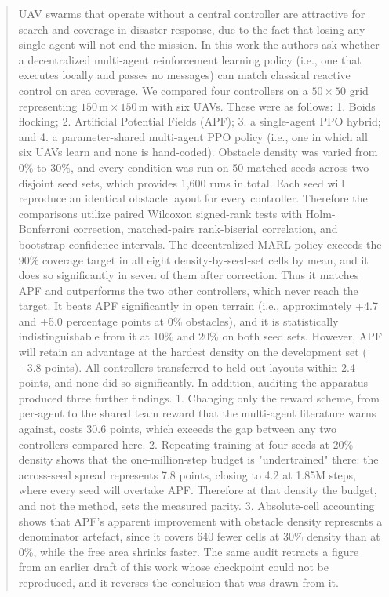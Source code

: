 \documentclass[a4paper, 10pt, conference]{ieeeconf}
\begin{document}
\begin{abstract}
UAV swarms that operate without a central controller are attractive
for search and coverage in disaster response, due to the fact that
losing any single agent will not end the mission. In this work the
authors ask whether a decentralized multi-agent reinforcement learning
policy (i.e., one that executes locally and passes no messages) can
match classical reactive control on area coverage. We compared four
controllers on a $50\times50$ grid representing
$150\,\text{m}\times150\,\text{m}$ with six UAVs. These were as
follows: 1. Boids flocking; 2. Artificial Potential Fields (APF); 3. a
single-agent PPO hybrid; and 4. a parameter-shared multi-agent PPO
policy (i.e., one in which all six UAVs learn and none is hand-coded).
Obstacle density was varied from 0\% to 30\%, and every condition was
run on 50 matched seeds across two disjoint seed sets, which provides
1{,}600 runs in total. Each seed will reproduce an identical obstacle
layout for every controller. Therefore the comparisons utilize paired
Wilcoxon signed-rank tests with Holm-Bonferroni correction,
matched-pairs rank-biserial correlation, and bootstrap confidence
intervals. The decentralized MARL policy exceeds the 90\% coverage
target in all eight density-by-seed-set cells by mean, and it does so
significantly in seven of them after correction. Thus it matches APF
and outperforms the two other controllers, which never reach the
target. It beats APF significantly in open terrain (i.e.,
approximately +4.7 and +5.0 percentage points at 0\% obstacles), and
it is statistically indistinguishable from it at 10\% and 20\% on both
seed sets. However, APF will retain an advantage at the hardest
density on the development set ($-3.8$ points). All controllers
transferred to held-out layouts within 2.4 points, and none did so
significantly. In addition, auditing the apparatus produced three
further findings. 1. Changing only the reward scheme, from per-agent
to the shared team reward that the multi-agent literature warns
against, costs 30.6 points, which exceeds the gap between any two
controllers compared here. 2. Repeating training at four seeds at 20\%
density shows that the one-million-step budget is "undertrained"
there: the across-seed spread represents 7.8 points, closing to 4.2 at
1.85M steps, where every seed will overtake APF. Therefore at that
density the budget, and not the method, sets the measured parity. 3.
Absolute-cell accounting shows that APF's apparent improvement with
obstacle density represents a denominator artefact, since it covers
640 fewer cells at 30\% density than at 0\%, while the free area
shrinks faster. The same audit retracts a figure from an earlier draft
of this work whose checkpoint could not be reproduced, and it reverses
the conclusion that was drawn from it.
\end{abstract}
\end{document}
